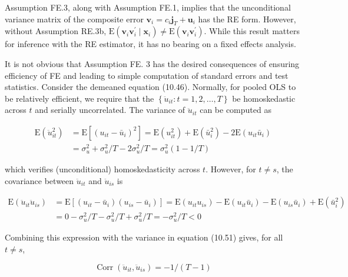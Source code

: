 \documentclass[10pt]{article}
\begin{document}
Assumption FE.3, along with Assumption FE.1, implies that the unconditional variance matrix of the composite error $\mathbf{v}_{i}=c_{i} \mathbf{j}_{T}+\mathbf{u}_{i}$ has the RE form. However, without Assumption RE.3b, $\mathrm{E}\left(\mathbf{v}_{i} \mathbf{v}_{i}^{\prime} \mid \mathbf{x}_{i}\right) \neq \mathrm{E}\left(\mathbf{v}_{i} \mathbf{v}_{i}^{\prime}\right)$. While this result matters for inference with the RE estimator, it has no bearing on a fixed effects analysis.

It is not obvious that Assumption FE. 3 has the desired consequences of ensuring efficiency of FE and leading to simple computation of standard errors and test statistics. Consider the demeaned equation (10.46). Normally, for pooled OLS to be relatively efficient, we require that the $\left\{\ddot{u}_{i t}: t=1,2, \ldots, T\right\}$ be homoskedastic across $t$ and serially uncorrelated. The variance of $\ddot{u}_{i t}$ can be computed as


\begin{align*}
\mathrm{E}\left(\ddot{u}_{i t}^{2}\right) & =\mathrm{E}\left[\left(u_{i t}-\bar{u}_{i}\right)^{2}\right]=\mathrm{E}\left(u_{i t}^{2}\right)+\mathrm{E}\left(\bar{u}_{i}^{2}\right)-2 \mathrm{E}\left(u_{i t} \bar{u}_{i}\right) \\
& =\sigma_{u}^{2}+\sigma_{u}^{2} / T-2 \sigma_{u}^{2} / T=\sigma_{u}^{2}(1-1 / T) \tag{10.51}
\end{align*}


which verifies (unconditional) homoskedasticity across $t$. However, for $t \neq s$, the covariance between $\ddot{u}_{i t}$ and $\ddot{u}_{i s}$ is

$$
\begin{aligned}
\mathrm{E}\left(\ddot{u}_{i t} \ddot{u}_{i s}\right) & =\mathrm{E}\left[\left(u_{i t}-\bar{u}_{i}\right)\left(u_{i s}-\bar{u}_{i}\right)\right]=\mathrm{E}\left(u_{i t} u_{i s}\right)-\mathrm{E}\left(u_{i t} \bar{u}_{i}\right)-\mathrm{E}\left(u_{i s} \bar{u}_{i}\right)+\mathrm{E}\left(\bar{u}_{i}^{2}\right) \\
& =0-\sigma_{u}^{2} / T-\sigma_{u}^{2} / T+\sigma_{u}^{2} / T=-\sigma_{u}^{2} / T<0
\end{aligned}
$$

Combining this expression with the variance in equation (10.51) gives, for all $t \neq s$,


\begin{equation*}
\operatorname{Corr}\left(\ddot{u}_{i t}, \ddot{u}_{i s}\right)=-1 /(T-1) \tag{10.52}
\end{equation*}
\end{document}
